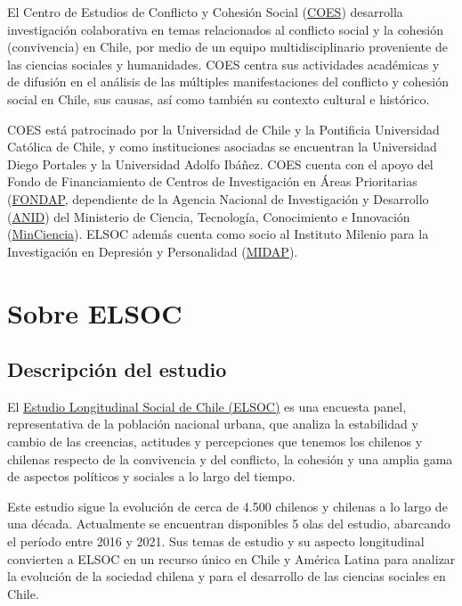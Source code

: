 \documentclass[
  12pt,
]{book}
\begin{document}
El Centro de Estudios de Conflicto y Cohesión Social (\href{https://coes.cl/}{COES}) desarrolla investigación colaborativa en temas relacionados al conflicto social y la cohesión (convivencia) en Chile, por medio de un equipo multidisciplinario proveniente de las ciencias sociales y humanidades. COES centra sus actividades académicas y de difusión en el análisis de las múltiples manifestaciones del conflicto y cohesión social en Chile, sus causas, así como también su contexto cultural e histórico.

COES está patrocinado por la Universidad de Chile y la Pontificia Universidad Católica de Chile, y como instituciones asociadas se encuentran la Universidad Diego Portales y la Universidad Adolfo Ibáñez. COES cuenta con el apoyo del Fondo de Financiamiento de Centros de Investigación en Áreas Prioritarias (\href{https://www.conicyt.cl/fondap/sobre-fondap/que-es-fondap/}{FONDAP}, dependiente de la Agencia Nacional de Investigación y Desarrollo (\href{https://www.anid.cl/}{ANID}) del Ministerio de Ciencia, Tecnología, Conocimiento e Innovación (\href{https://www.minciencia.gob.cl/}{MinCiencia}). ELSOC además cuenta como socio al Instituto Milenio para la Investigación en Depresión y Personalidad (\href{https://midap.org/}{MIDAP}).

\hypertarget{sobre-elsoc}{%
\section{Sobre ELSOC}\label{sobre-elsoc}}

\hypertarget{descripciuxf3n-del-estudio}{%
\subsection{Descripción del estudio}\label{descripciuxf3n-del-estudio}}

El \href{https://coes.cl/encuesta-panel/}{Estudio Longitudinal Social de Chile (ELSOC)} es una encuesta panel, representativa de la población nacional urbana, que analiza la estabilidad y cambio de las creencias, actitudes y percepciones que tenemos los chilenos y chilenas respecto de la convivencia y del conflicto, la cohesión y una amplia gama de aspectos políticos y sociales a lo largo del tiempo.

Este estudio sigue la evolución de cerca de 4.500 chilenos y chilenas a lo largo de una década. Actualmente se encuentran disponibles 5 olas del estudio, abarcando el período entre 2016 y 2021. Sus temas de estudio y su aspecto longitudinal convierten a ELSOC en un recurso único en Chile y América Latina para analizar la evolución de la sociedad chilena y para el desarrollo de las ciencias sociales en Chile.
\end{document}
